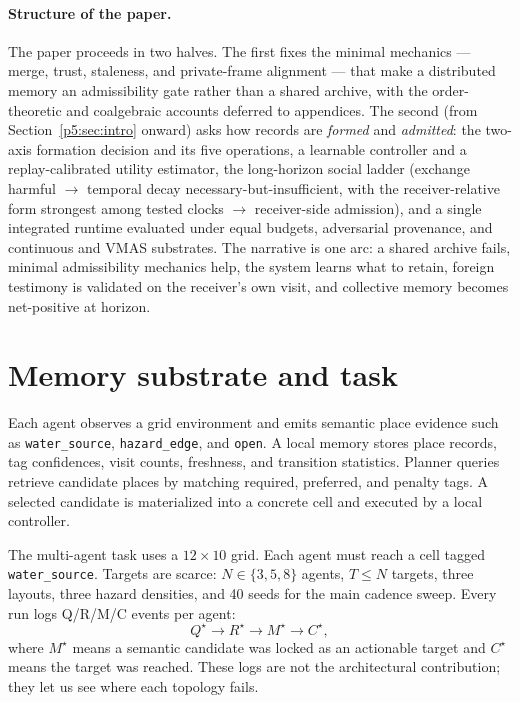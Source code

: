 \documentclass{article}
\begin{document}
\paragraph{Structure of the paper.} The paper proceeds in two halves.
The first fixes the minimal
mechanics --- merge, trust, staleness, and private-frame alignment ---
that make a distributed memory an admissibility gate rather than a
shared archive, with the order-theoretic and coalgebraic accounts
deferred to appendices. The second (from
Section~\ref{p5:sec:intro} onward) asks how records are \emph{formed}
and \emph{admitted}: the two-axis formation decision and its five
operations, a learnable controller and a replay-calibrated utility
estimator, the long-horizon social ladder (exchange harmful $\to$
temporal decay necessary-but-insufficient, with the receiver-relative
form strongest among tested clocks $\to$ receiver-side admission),
and a single integrated runtime evaluated under equal budgets,
adversarial provenance, and continuous and VMAS substrates. The narrative
is one arc: a shared archive fails, minimal admissibility mechanics
help, the system learns what to retain, foreign testimony is validated
on the receiver's own visit, and collective memory becomes net-positive
at horizon.


\section{Memory substrate and task}
\label{p4:sec:substrate}

Each agent observes a grid environment and emits semantic place
evidence such as \texttt{water\_source}, \texttt{hazard\_edge}, and
\texttt{open}. A local memory stores place records, tag confidences,
visit counts, freshness, and transition statistics. Planner queries
retrieve candidate places by matching required, preferred, and penalty
tags. A selected candidate is materialized into a concrete cell and
executed by a local controller.

The multi-agent task uses a $12{\times}10$ grid. Each agent must reach
a cell tagged \texttt{water\_source}. Targets are scarce:
$N{\in}\{3,5,8\}$ agents, $T{\le}N$ targets, three layouts, three
hazard densities, and 40 seeds for the main cadence sweep. Every run
logs Q/R/M/C events per agent:
\[
Q^\star \rightarrow R^\star \rightarrow M^\star \rightarrow C^\star,
\]
where $M^\star$ means a semantic candidate was locked as an actionable
target and $C^\star$ means the target was reached. These logs are not
the architectural contribution; they let us see where each topology
fails.
\end{document}
